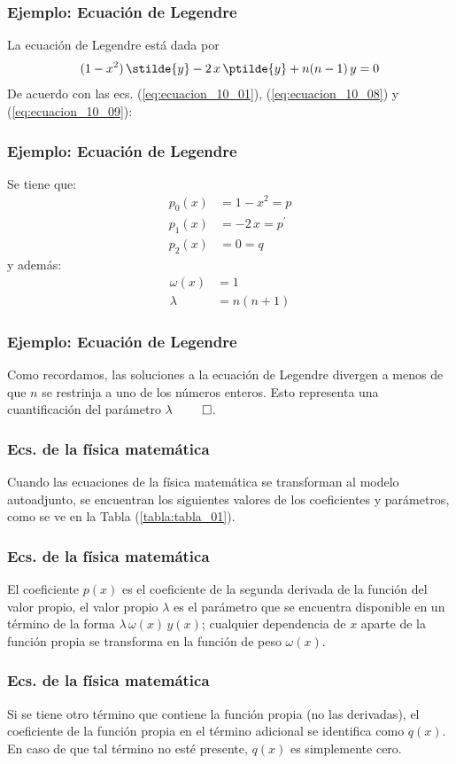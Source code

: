 \begin{frame}
\frametitle{Ejemplo: Ecuación de Legendre}
La ecuación de Legendre está dada por
\begin{align}
(1 - x^{2}) \, \stilde{y} - 2 \, x \, \ptilde{y} +  n(n -1) \, y = 0
\label{eq:ecuacion_10_09}
\end{align}
De acuerdo con las ecs. (\ref{eq:ecuacion_10_01}), (\ref{eq:ecuacion_10_08}) y (\ref{eq:ecuacion_10_09}):
\end{frame}
\begin{frame}
\frametitle{Ejemplo: Ecuación de Legendre}
Se tiene que:
\begin{align*}
p_{0} (x) &= 1 - x^{2} = p \\
p_{1} (x) &= -2 \, x = p^{\prime} \\
p_{2} (x) &= 0 = q
\end{align*}
y además:
\begin{align*}
\omega (x) &= 1 \\
\lambda &= n (n + 1)
\end{align*}
\end{frame}
\begin{frame}
\frametitle{Ejemplo: Ecuación de Legendre}
Como recordamos, las soluciones a la ecuación de Legendre divergen a menos de que $n$ se restrinja a uno de los números enteros. Esto representa una cuantificación del parámetro $\lambda$ $\qed$.
\end{frame}
\begin{frame}
\frametitle{Ecs. de la física matemática}
Cuando las ecuaciones de la física matemática se transforman al modelo autoadjunto, se encuentran los siguientes valores de los coeficientes y parámetros, como se ve en la Tabla (\ref{tabla:tabla_01}).
\end{frame}
\begin{frame}
\frametitle{Ecs. de la física matemática}
El coeficiente $p(x)$ es el coeficiente de la segunda derivada de la función del valor propio, el valor propio $\lambda$ es el parámetro que se encuentra disponible en un término de la forma $\lambda \, \omega (x) \, y(x)$; cualquier dependencia de $x$ aparte de la función propia se transforma en la función de peso $\omega (x)$.
\end{frame}
\begin{frame}
\frametitle{Ecs. de la física matemática}
Si se tiene otro término que contiene la función propia (no las derivadas), el coeficiente de la función propia en el término adicional se identifica como $q(x)$. En caso de que tal término no esté presente, $q(x)$ es simplemente cero.
\end{frame}
